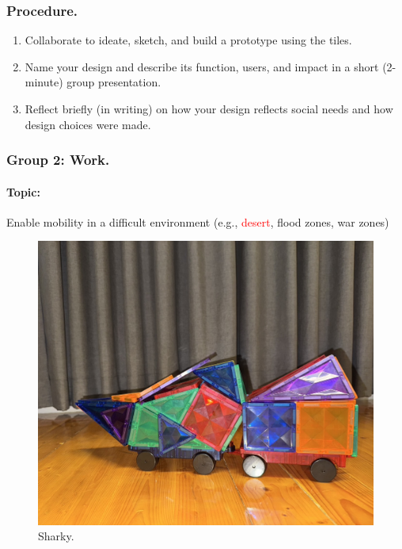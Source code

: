 \documentclass[11pt]{book}
\begin{document}
				\subsubsection{Procedure.}
					\begin{enumerate}
						\item Collaborate to ideate, sketch, and build a prototype using the tiles.
						\item Name your design and describe its function, users, and impact in a short (2-minute) group presentation.
						\item Reflect briefly (in writing) on how your design reflects social needs and how design choices were made.
					\end{enumerate}
					
\newpage
					
				\subsubsection{Group 2: Work.}
					\paragraph{Topic:}
						Enable mobility in a difficult environment (e.g., \textcolor{red}{desert}, flood zones, war zones)
						\begin{figure}[H]
							\begin{center}
  							\includegraphics[scale=0.2]{Materials/S__41934851}
  							\end{center}
 							\caption{Sharky.}
						\end{figure}
\end{document}
